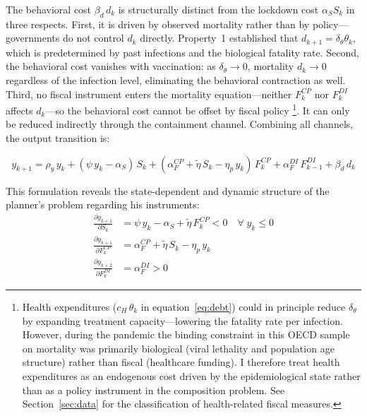 \documentclass[12pt, a4paper]{article}
\begin{document}
\noindent The behavioral cost $\beta_d\, d_k$ is structurally distinct from the lockdown cost $\alpha_S S_k$ in three respects. First, it is driven by observed mortality rather than by policy---governments do not control $d_k$ directly. Property~1 established that $d_{k+1} = \delta_\theta \theta_k$, which is predetermined by past infections and the biological fatality rate. Second, the behavioral cost vanishes with vaccination: as $\delta_\theta \to 0$, mortality $d_k \to 0$ regardless of the infection level, eliminating the behavioral contraction as well. Third, no fiscal instrument enters the mortality equation---neither $F^{CP}_k$ nor $F^{DI}_k$ affects $d_k$---so the behavioral cost cannot be offset by fiscal policy \footnote{Health expenditures ($c_H\,\theta_k$ in 
equation~\ref{eq:debt}) could in principle reduce $\delta_\theta$ 
by expanding treatment capacity---lowering the fatality rate per 
infection. However, during the pandemic the binding constraint in this OECD sample on mortality was primarily biological (viral lethality and population 
age structure) rather than fiscal (healthcare funding). I therefore 
treat health expenditures as an endogenous cost driven by the 
epidemiological state rather than as a policy instrument in the 
composition problem. See Section~\ref{sec:data} for the 
classification of health-related fiscal measures.}. It can only be reduced indirectly through the containment channel. Combining all channels, the output transition is:


%
\begin{equation}{
    y_{k+1} = \rho_y\, y_k + (\psi\, y_k - \alpha_S)\, S_k + (\alpha^{CP}_F + \tilde{\eta}\, S_k - \eta_p\, y_k)\, F^{CP}_k + \alpha^{DI}_F\,F^{DI}_{k-1} + \beta_d\, d_k
}
\label{eq:output}
\end{equation}
%

\noindent This formulation reveals the state-dependent and dynamic structure of the planner's problem regarding his instruments:
%
\begin{align}
    \frac{\partial y_{k+1}}{\partial S_k} &= \psi\, y_k - \alpha_S + \tilde{\eta}\, F^{CP}_k < 0 \quad \forall\; y_k \leq 0
    \label{eq:marginal_S} \\[6pt]
    \frac{\partial y_{k+1}}{\partial F^{CP}_k} &= \alpha^{CP}_F + \tilde{\eta}\, S_k - \eta_p\, y_k
    \label{eq:marginal_CP} \\[6pt]
    \frac{\partial y_{k+2}}{\partial F^{DI}_k} &= \alpha^{DI}_F > 0
    \label{eq:marginal_DI}
\end{align}
\end{document}
